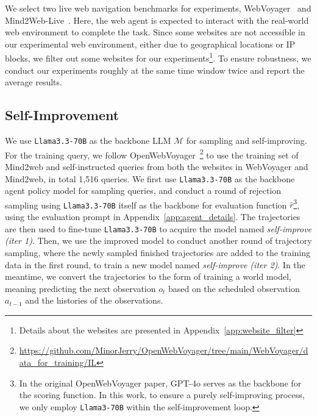 \documentclass[11pt]{article}
\begin{document}
We select two live web navigation benchmarks for experiments, WebVoyager~\citep{webvoyager} and Mind2Web-Live~\citep{webcanvas}. 
Here, the web agent is expected to interact with the real-world web environment to complete the task.
Since some websites are not accessible in our experimental web environment, either due to geographical locations or IP blocks, we filter out some websites for our experiments\footnote{Details about the websites are presented in Appendix~\ref{app:website_filter}}.
To ensure robustness, we conduct our experiments roughly at the same time window twice and report the average results. 








\subsection{Self-Improvement}

We use \texttt{Llama3.3-70B} as the backbone LLM $\mathcal{M}$ for sampling and self-improving.
For the training query, we follow OpenWebVoyager~\citep{openwebvoyager}\footnote{\url{https://github.com/MinorJerry/OpenWebVoyager/tree/main/WebVoyager/data_for_training/IL}} to use the training set of Mind2web and self-instructed queries from both the websites in WebVoyager and Mind2web, in total 1,516 queries.
We first use \texttt{Llama3.3-70B} as the backbone agent policy model for sampling queries, and conduct a round of rejection sampling using \texttt{Llama3.3-70B} itself as the backbone for evaluation function $\hat{r}$\footnote{In the original OpenWebVoyager paper, GPT-4o serves as the backbone for the scoring function. In this work, to ensure a purely self-improving process, we only employ \texttt{Llama3-70B} within the self-improvement loop.}, using the evaluation prompt in Appendix~\ref{app:agent_details}.
The trajectories are then used to fine-tune \texttt{Llama3.3-70B} to acquire the model named \textit{self-improve (iter 1)}. 
Then, we use the improved model to conduct another round of trajectory sampling, where the newly sampled finished trajectories are added to the training data in the first round, to train a new model named \textit{self-improve (iter 2)}. 
In the meantime, we convert the trajectories to the form of training a world model, meaning predicting the next observation $o_t$ based on the scheduled observation $a_{t-1}$ and the histories of the observations. 
\end{document}
